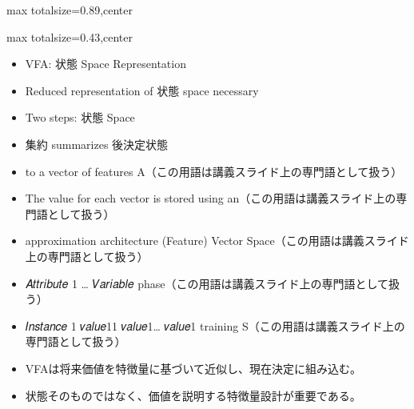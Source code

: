 \begin{minipage}[t]{0.58\textwidth}
\begin{adjustbox}{max totalsize={\textwidth}{0.89\textheight},center}
\begin{minipage}{\textwidth}
\end{minipage}
\end{adjustbox}
\end{minipage}


\clearpage
{}
\begin{minipage}[t]{0.405\textwidth}
\begin{adjustbox}{max totalsize={\textwidth}{0.43\textheight},center}
\begin{minipage}{\textwidth}\scriptsize
{}\begin{itemize}
\item VFA: 状態 Space Representation
\item Reduced representation of 状態 space necessary
\item Two steps: 状態 Space
\item 集約 summarizes 後決定状態
\item to a vector of features A（この用語は講義スライド上の専門語として扱う）
\item The value for each vector is stored using an（この用語は講義スライド上の専門語として扱う）
\item approximation architecture (Feature) Vector Space（この用語は講義スライド上の専門語として扱う）
\item 𝐴𝑡𝑡𝑟𝑖𝑏𝑢𝑡𝑒 1 … 𝑉𝑎𝑟𝑖𝑎𝑏𝑙𝑒 phase（この用語は講義スライド上の専門語として扱う）
\item 𝐼𝑛𝑠𝑡𝑎𝑛𝑐𝑒 1 𝑣𝑎𝑙𝑢𝑒11 𝑣𝑎𝑙𝑢𝑒1… 𝑣𝑎𝑙𝑢𝑒1 training S（この用語は講義スライド上の専門語として扱う）
\end{itemize}\begin{itemize}
\item VFAは将来価値を特徴量に基づいて近似し、現在決定に組み込む。
\item 状態そのものではなく、価値を説明する特徴量設計が重要である。
\end{itemize}
\end{minipage}
\end{adjustbox}
\end{minipage}\hfill
